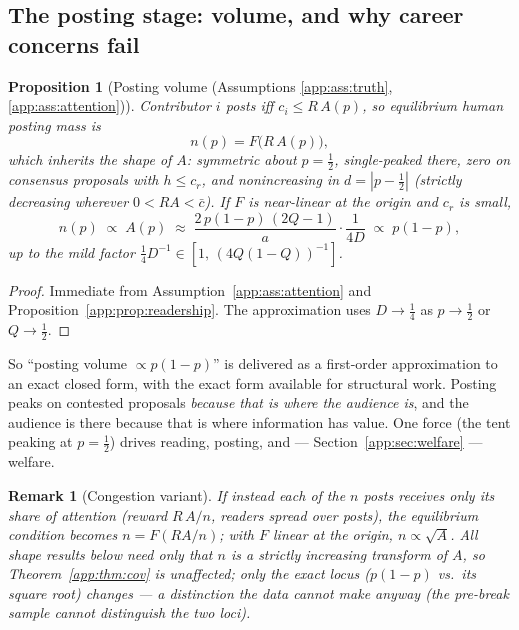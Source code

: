 \documentclass[12pt]{article}
\newtheorem{proposition}{Proposition}
\newtheorem{remark}{Remark}
\begin{document}
\subsection{The posting stage: volume, and why career concerns fail}
\label{app:sec:post}

\begin{proposition}[Posting volume (Assumptions \ref{app:ass:truth}, \ref{app:ass:attention})]
\label{app:prop:volume}
Contributor $i$ posts iff $c_i\le R\,A(p)$, so equilibrium human posting mass is
\begin{equation}\label{app:eq:n}
n(p)=F\bigl(R\,A(p)\bigr),
\end{equation}
which inherits the shape of $A$: symmetric about $p=\tfrac12$, single-peaked
there, zero on consensus proposals with $h\le c_r$, and nonincreasing in
$d=|p-\tfrac12|$ (strictly decreasing wherever $0<RA<\bar c$). If $F$ is
near-linear at the origin and $c_r$ is small,
\[
n(p)\;\propto\;A(p)\;\approx\;\frac{2\,p(1-p)\,(2Q-1)}{a}\cdot\frac{1}{4D}
\;\propto\; p(1-p),
\]
up to the mild factor $\tfrac14 D^{-1}\in[1,\,(4Q(1-Q))^{-1}]$.
\end{proposition}

\begin{proof}
Immediate from Assumption~\ref{app:ass:attention} and
Proposition~\ref{app:prop:readership}. The approximation uses $D\to\tfrac14$ as
$p\to\tfrac12$ or $Q\to\tfrac12$.
\end{proof}

So ``posting volume $\propto p(1-p)$'' is delivered as a first-order
approximation to an exact closed form, with the exact form available for
structural work. Posting peaks on contested proposals \emph{because that is
where the audience is}, and the audience is there because that is where
information has value. One force (the tent peaking at $p=\tfrac12$) drives
reading, posting, and --- Section~\ref{app:sec:welfare} --- welfare.

\begin{remark}[Congestion variant]\label{app:rem:congestion}
If instead each of the $n$ posts receives only its \emph{share} of attention
(reward $R\,A/n$, readers spread over posts), the equilibrium condition becomes
$n=F(RA/n)$; with $F$ linear at the origin, $n\propto\sqrt{A}$. All shape
results below need only that $n$ is a strictly increasing transform of $A$, so
Theorem~\ref{app:thm:cov} is unaffected; only the exact locus ($p(1-p)$ vs.\ its
square root) changes --- a distinction the data cannot make anyway
(the pre-break sample cannot distinguish the two loci).
\end{remark}
\end{document}
